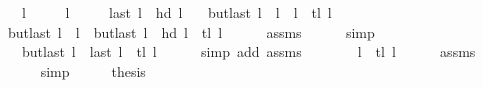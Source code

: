 \begin{isabellebody}
\ \ \ {\isachardoublequoteopen}l{}\ {\isasymnoteq}\ {\isacharbrackleft}{\kern0pt}{\isacharbrackright}{\kern0pt}{\isachardoublequoteclose}\isanewline
\ \ \ {\isachardoublequoteopen}l{}\ {\isasymnoteq}\ {\isacharbrackleft}{\kern0pt}{\isacharbrackright}{\kern0pt}{\isachardoublequoteclose}\isanewline
\ \ \ {\isachardoublequoteopen}last\ l{}\ {\isacharequal}{\kern0pt}\ hd\ l{}{\isachardoublequoteclose}\isanewline
\ \ \ {\isachardoublequoteopen}butlast\ l{}\ {\isacharat}{\kern0pt}\ l{}\ {\isacharequal}{\kern0pt}\ l{}\ {\isacharat}{\kern0pt}\ tl\ l{}{\isachardoublequoteclose}\isanewline
%
\isadelimproof
%
\endisadelimproof
%
\isatagproof
{}\isamarkupfalse%
\ {\isacharminus}{\kern0pt}\isanewline
\ \ \isamarkupfalse%
\ {\isachardoublequoteopen}butlast\ l{}\ {\isacharat}{\kern0pt}\ l{}\ {\isacharequal}{\kern0pt}\ butlast\ l{}\ {\isacharat}{\kern0pt}\ hd\ l{}\ {\isacharhash}{\kern0pt}\ tl\ l{}{\isachardoublequoteclose}\isanewline
\ \ \ \ \isamarkupfalse%
\ assms{\isacharparenleft}{\kern0pt}{}{\isacharparenright}{\kern0pt}\isanewline
\ \ \ \ \isamarkupfalse%
\ simp\isanewline
\ \ \isamarkupfalse%
\ \isamarkupfalse%
\ {\isachardoublequoteopen}{\isachardot}{\kern0pt}{\isachardot}{\kern0pt}{\isachardot}{\kern0pt}\ {\isacharequal}{\kern0pt}\ butlast\ l{}\ {\isacharat}{\kern0pt}\ last\ l{}\ {\isacharhash}{\kern0pt}\ tl\ l{}{\isachardoublequoteclose}\isanewline
\ \ \ \ \isamarkupfalse%
\ {\isacharparenleft}{\kern0pt}simp\ add{\isacharcolon}{\kern0pt}\ assms{\isacharparenleft}{\kern0pt}{}{\isacharparenright}{\kern0pt}{\isacharparenright}{\kern0pt}\isanewline
\ \ \isamarkupfalse%
\ \isamarkupfalse%
\ {\isachardoublequoteopen}{\isachardot}{\kern0pt}{\isachardot}{\kern0pt}{\isachardot}{\kern0pt}\ {\isacharequal}{\kern0pt}\ l{}\ {\isacharat}{\kern0pt}\ tl\ l{}{\isachardoublequoteclose}\isanewline
\ \ \ \ \isamarkupfalse%
\ assms{\isacharparenleft}{\kern0pt}{}{\isacharparenright}{\kern0pt}\isanewline
\ \ \ \ \isamarkupfalse%
\ simp\isanewline
\ \ \isamarkupfalse%
\ \isamarkupfalse%
\ {\isacharquery}{\kern0pt}thesis\isanewline
\ \ \ \ \isacommand{{\isachardot}{\kern0pt}}\isamarkupfalse%

\end{isabellebody}
